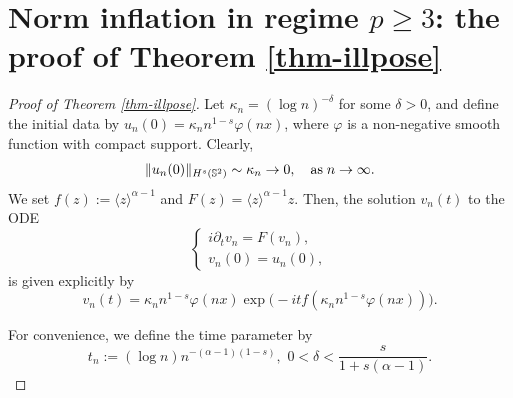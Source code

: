\documentclass[11pt, reqno]{amsart}
\numberwithin{equation}{section}
\theoremstyle{definition}
\theoremstyle{remark}
\begin{document}


\section{Norm inflation in regime $p\geq3$: the proof of Theorem \ref{thm-illpose}}
\begin{proof}[Proof of Theorem \ref{thm-illpose}]
Let $\kappa_n = (\log n)^{-\delta}$ for some $\delta > 0$, and define the initial data by $u_n(0) = \kappa_n n^{1-s} \varphi(nx)$, where $\varphi$ is a non-negative smooth function with compact support. Clearly,
\begin{equation*}
\|u_n(0)\|_{H^s(\Bbb S^2)} \sim \kappa_n \to 0,\quad \text{as}\;n\to\infty.
\end{equation*}
We set $f(z) := \langle z\rangle^{\alpha-1}$ and {$F(z)=\langle z\rangle^{\alpha-1}z$}. Then, the solution $v_n(t)$ to the ODE
\begin{equation*}
\begin{cases}
i\partial_t v_n = F(v_n),\\
v_n(0) = u_n(0),
\end{cases}
\end{equation*} 
is given explicitly by
\begin{equation*}
v_n(t) = \kappa_n n^{1-s} \varphi(nx) \exp\big(-itf(\kappa_n n^{1-s} \varphi(nx))\big).
\end{equation*}
		
For convenience, we define the time parameter by
\begin{equation}\label{fml-two-para}
t_n:=(\log n)n^{-(\alpha-1)(1-s)},\,\, 0<\delta<\frac{s}{1+s(\alpha-1)}.
\end{equation}
		

\end{proof}
\end{document}
